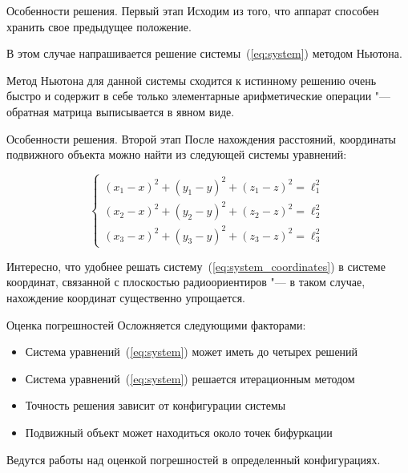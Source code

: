 \documentclass[russian,hyperref={unicode}]{beamer}
\begin{document}
  \begin{frame}{Особенности решения. Первый этап}
    Исходим из того, что аппарат способен хранить свое предыдущее положение.

    В этом случае напрашивается решение системы~(\ref{eq:system}) методом Ньютона.

    Метод Ньютона для данной системы сходится к истинному решению очень быстро и
    содержит в себе только элементарные арифметические операции "--- обратная матрица
    выписывается в явном виде.
  \end{frame}

  \begin{frame}{Особенности решения. Второй этап}
    После нахождения расстояний, координаты подвижного объекта можно найти из следующей
    системы уравнений:

    \begin{equation}\label{eq:system_coordinates}
      \begin{cases}
        \left(x_1 - x\right)^2 + \left(y_1 - y\right)^2 + \left(z_1 - z\right)^2 = \ell_1^2 \\
        \left(x_2 - x\right)^2 + \left(y_2 - y\right)^2 + \left(z_2 - z\right)^2 = \ell_2^2 \\
        \left(x_3 - x\right)^2 + \left(y_3 - y\right)^2 + \left(z_3 - z\right)^2 = \ell_3^2
      \end{cases}
    \end{equation}

    Интересно, что удобнее решать систему~(\ref{eq:system_coordinates}) в системе координат,
    связанной с плоскостью радиоориентиров "--- в таком случае, нахождение координат
    существенно упрощается.
  \end{frame}

  \begin{frame}{Оценка погрешностей}
    Осложняется следующими факторами:
    \begin{itemize}
      \item Система уравнений~(\ref{eq:system}) может иметь до четырех решений
      \item Система уравнений~(\ref{eq:system}) решается итерационным методом
      \item Точность решения зависит от конфигурации системы
      \item Подвижный объект может находиться около точек бифуркации
    \end{itemize}

    Ведутся работы над оценкой погрешностей в определенный конфигурациях.
  \end{frame}
\end{document}
